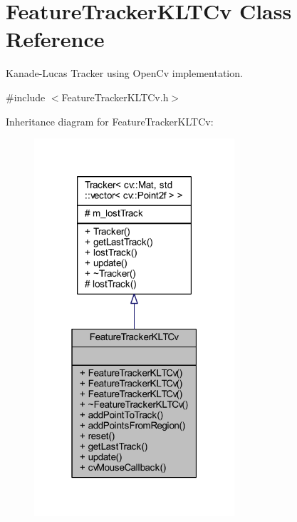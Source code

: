 \hypertarget{class_viscv_1_1_feature_tracker_k_l_t_cv}{}\section{Feature\+Tracker\+K\+L\+T\+Cv Class Reference}
\label{class_viscv_1_1_feature_tracker_k_l_t_cv}


Kanade-\/\+Lucas Tracker using Open\+Cv implementation.  




{\ttfamily \#include $<$Feature\+Tracker\+K\+L\+T\+Cv.\+h$>$}



Inheritance diagram for Feature\+Tracker\+K\+L\+T\+Cv\+:
\nopagebreak
\begin{figure}[H]
\begin{center}
\leavevmode
\includegraphics[width=211pt]{class_viscv_1_1_feature_tracker_k_l_t_cv__inherit__graph}
\end{center}
\end{figure}


